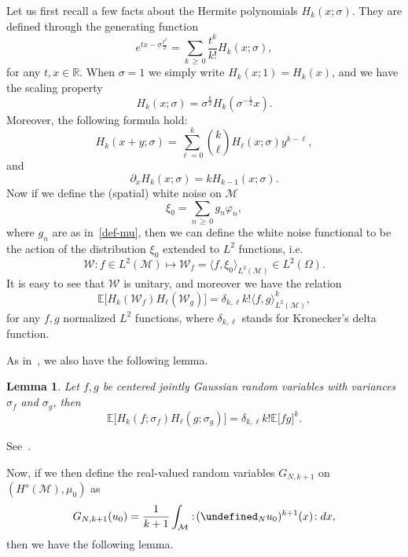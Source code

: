 \documentclass[10pt]{amsart}
\newtheorem{lemm}[theo]{Lemma}\newtheorem{prop}[theo]{Proposition}\newtheorem{coro}[theo]{Corollary}\newtheorem{conj}[theo]{Conjecture}
\theoremstyle{definition}\newtheorem{defi}[theo]{Definition}\newtheorem{rema}[theo]{Remark}\newtheorem{exam}[theo]{Example}\newtheorem{exem}[theo]{Example}\newtheorem{nota}[theo]{Notation}
\newcommand{\R}{\mathbb{R}}
\newcommand{\E}{\mathbb{E}}
\let\P= \undefined
\newcommand{\P}{\mathbf{P}}
\newcommand{\M}{\mathcal{M}}
\newcommand{\dl}{\delta}
\newcommand{\s}{\sigma}
\newcommand{\dx}{\partial_x}
\newcommand{\W}{\mathcal{W}}
\renewcommand{\O}{\Omega}
\begin{document}
Let us first recall a few facts about the Hermite polynomials $H_k(x;\s)$. They are defined through the generating function
\begin{equation*}
e^{tx-\s\frac{t^2}{2}}=\sum_{k\,\geq\,0}\frac{t^k}{k!}H_k(x;\s),
\end{equation*}
for any $t,x\in\R$. When $\s=1$ we simply write $H_k(x;1)=H_k(x)$, and we have the scaling property
\begin{equation*}
H_k(x;\s)=\s^{\frac{k}{2}}H_k\left(\s^{-\frac12}x\right).
\end{equation*}
Moreover, the following formula hold:
\begin{equation}\label{Hsum}
H_k(x+y;\s) = \sum_{\ell=0}^k {\binom k \ell} H_{\ell}(x;\s)y^{k-\ell},
\end{equation}
and
\begin{equation}\label{Hdif}
\dx H_k(x;\s) = kH_{k-1}(x;\s).
\end{equation}
Now if we define the (spatial) white noise on $\M$
\begin{equation*}
\xi_0=\sum_{n\,\geq\,0}g_n\varphi_n,
\end{equation*}
where $g_n$ are as in~\eqref{def-mu}, then we can define the white noise functional to be the action of the distribution $\xi_0$ extended to $L^2$ functions, i.e.
\begin{equation*}
\W: f\in L^2(\M)\longmapsto \W_f = \langle f,\xi_0\rangle_{L^2(\M)}\in L^2(\O).
\end{equation*}
It is easy to see that $\W$ is unitary, and moreover we have the relation
\begin{equation}\label{WNF-perp}
\E\big[H_k(\W_f)H_{\ell}(\W_g)\big] = \dl_{k,\ell}k!\langle f,g\rangle_{L^2(\M)}^k,
\end{equation}
for any $f,g$ normalized $L^2$ functions, where $\dl_{k,\ell}$ stands for Kronecker's delta function.

As in~\cite{GKO}, we also have the following lemma.
\begin{lemm}
Let $f,g$ be centered jointly Gaussian random variables with variances $\s_f$ and $\s_g$, then
\begin{equation}\label{prod-wick}
\E\big[H_k\left(f;\s_f\right)H_{\ell}\left(g;\s_g\right)\big] = \delta_{k,\ell}k!\E\big[fg\big]^k.
\end{equation}
\end{lemm}
See~\cite[Lemma~1.1.1]{Nualart}.

Now, if we then define the real-valued random variables $G_{N,k+1}$ on $(H^s(\M),\mu_0)$ as
\begin{align*}
G_{N,k+1}(u_0) = \frac{1}{k+1}\int_{\M} :\! (\P_N u_0)^{k+1} (x)\!: dx,
\end{align*}
then we have the following lemma.
\end{document}
